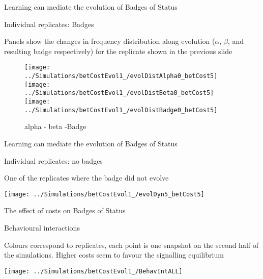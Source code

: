 \documentclass[
  ignorenonframetext,
]{beamer}
\begin{document}
\begin{frame}{Learning can mediate the evolution of Badges of Status}
\protect\hypertarget{learning-can-mediate-the-evolution-of-badges-of-status-2}{}

\begin{block}{Individual replicates: Badges}

\small

Panels show the changes in frequency distribution along evolution
(\(\alpha\), \(\beta\), and resulting badge respectively) for the
replicate shown in the previous slide

\begin{figure}

\texttt{[image: ../Simulations/betCostEvol1\_/evolDistAlpha0\_betCost5]} \texttt{[image: ../Simulations/betCostEvol1\_/evolDistBeta0\_betCost5]} \texttt{[image: ../Simulations/betCostEvol1\_/evolDistBadge0\_betCost5]} \hfill{}

\caption{alpha - beta -Badge}\label{fig:unnamed-chunk-17}
\end{figure}

\end{block}

\end{frame}

\begin{frame}{Learning can mediate the evolution of Badges of Status}
\protect\hypertarget{learning-can-mediate-the-evolution-of-badges-of-status-3}{}

\begin{block}{Individual replicates: no badges}

\small

One of the replicates where the badge did not evolve

\begin{center}\texttt{[image: ../Simulations/betCostEvol1\_/evolDyn5\_betCost5]} \end{center}

\end{block}

\end{frame}

\begin{frame}{The effect of costs on Badges of Status}
\protect\hypertarget{the-effect-of-costs-on-badges-of-status}{}

\begin{block}{Behavioural interactions}

\small

Colours correspond to replicates, each point is one snapshot on the
second half of the simulations. Higher costs seem to favour the
signalling equilibrium

\begin{center}\texttt{[image: ../Simulations/betCostEvol1\_/BehavIntALL]} \end{center}

\end{block}

\end{frame}
\end{document}
